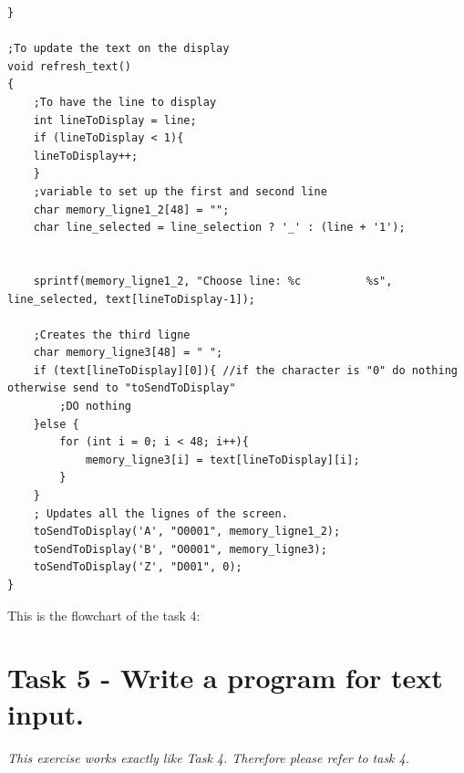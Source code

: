 \documentclass[a4paper,12pt]{article}
\begin{document}
\begin{lstlisting}
}

;To update the text on the display
void refresh_text()
{
	;To have the line to display
	int lineToDisplay = line;
	if (lineToDisplay < 1){
	lineToDisplay++;
	}
	;variable to set up the first and second line 
	char memory_ligne1_2[48] = "";
	char line_selected = line_selection ? '_' : (line + '1');

	
	sprintf(memory_ligne1_2, "Choose line: %c          %s", line_selected, text[lineToDisplay-1]);

	;Creates the third ligne 
	char memory_ligne3[48] = " ";
	if (text[lineToDisplay][0]){ //if the character is "0" do nothing otherwise send to "toSendToDisplay"
		;DO nothing
	}else { 
		for (int i = 0; i < 48; i++){
			memory_ligne3[i] = text[lineToDisplay][i];
		}
	}
	; Updates all the lignes of the screen. 
	toSendToDisplay('A', "O0001", memory_ligne1_2);
	toSendToDisplay('B', "O0001", memory_ligne3);
	toSendToDisplay('Z', "D001", 0);
}

\end{lstlisting}

\newpage
This is the flowchart of the task 4:
\begin{center}
\end{center}
\newpage
\section{Task 5 - Write a program for text input. }
\textit{This exercise works exactly like Task 4. Therefore please refer to task 4.}



\end{document}
